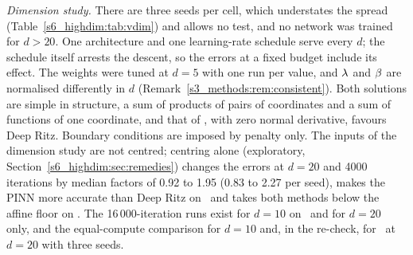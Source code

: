 \emph{Dimension study.} There are three seeds per cell, which understates the spread
(Table~\ref{s6_highdim:tab:vdim}) and allows no test, and no network was trained for
$d>20$. One architecture and one learning-rate schedule serve every $d$; the schedule
itself arrests the descent, so the errors at a fixed budget include its effect. The
weights were tuned at $d=5$ with one run per value, and $\lambda$ and $\beta$ are normalised
differently in $d$ (Remark~\ref{s3_methods:rem:consistent}). Both solutions are simple in
structure, a sum of products of pairs of coordinates and a sum of functions of one
coordinate, and that of \Ptwo, with zero normal derivative, favours Deep Ritz. Boundary
conditions are imposed by penalty only. The inputs of the dimension study are not centred;
centring alone (exploratory, Section~\ref{s6_highdim:sec:remedies}) changes the errors at $d=20$
and 4000 iterations by median factors of 0.92 to 1.95 (0.83 to 2.27 per seed), makes the PINN more
accurate than Deep Ritz on \Pone\ and takes both methods below the affine floor on \Ptwo. The 16\,000-iteration runs exist for $d=10$ on
\Pone\ and for $d=20$ only, and the equal-compute comparison for $d=10$ and, in the re-check,
for \Pone\ at $d=20$ with three seeds.

